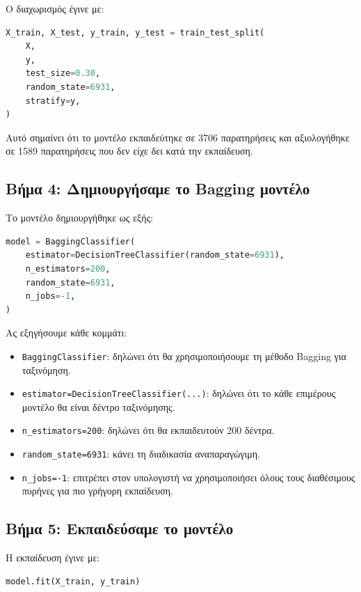 \documentclass[12pt,a4paper]{article}
\newcommand{\code}[1]{\texttt{\textenglish{#1}}}
\begin{document}
Ο διαχωρισμός έγινε με:

\begin{lstlisting}[language=Python]
X_train, X_test, y_train, y_test = train_test_split(
    X,
    y,
    test_size=0.30,
    random_state=6931,
    stratify=y,
)
\end{lstlisting}

Αυτό σημαίνει ότι το μοντέλο εκπαιδεύτηκε σε 3706 παρατηρήσεις και
αξιολογήθηκε σε 1589 παρατηρήσεις που δεν είχε δει κατά την εκπαίδευση.

\subsection{Βήμα 4: Δημιουργήσαμε το Bagging μοντέλο}

Το μοντέλο δημιουργήθηκε ως εξής:

\begin{lstlisting}[language=Python]
model = BaggingClassifier(
    estimator=DecisionTreeClassifier(random_state=6931),
    n_estimators=200,
    random_state=6931,
    n_jobs=-1,
)
\end{lstlisting}

Ας εξηγήσουμε κάθε κομμάτι:

\begin{itemize}
    \item \code{BaggingClassifier}: δηλώνει ότι θα χρησιμοποιήσουμε τη μέθοδο
    Bagging για ταξινόμηση.
    \item \code{estimator=DecisionTreeClassifier(...)}: δηλώνει ότι το κάθε
    επιμέρους μοντέλο θα είναι δέντρο ταξινόμησης.
    \item \code{n\_estimators=200}: δηλώνει ότι θα εκπαιδευτούν 200 δέντρα.
    \item \code{random\_state=6931}: κάνει τη διαδικασία αναπαραγώγιμη.
    \item \code{n\_jobs=-1}: επιτρέπει στον υπολογιστή να χρησιμοποιήσει όλους
    τους διαθέσιμους πυρήνες για πιο γρήγορη εκπαίδευση.
\end{itemize}

\subsection{Βήμα 5: Εκπαιδεύσαμε το μοντέλο}

Η εκπαίδευση έγινε με:

\begin{lstlisting}[language=Python]
model.fit(X_train, y_train)
\end{lstlisting}
\end{document}
